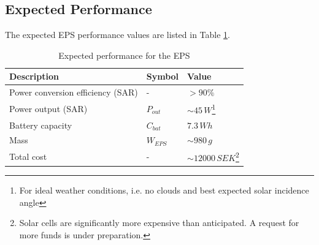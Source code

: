 \subsection{Expected Performance}
The expected \ac{EPS} performance values are listed in Table \ref{tab:expected_performance}.
%
\begin{table}[H]
\centering
\caption{Expected performance for the \ac{EPS}}
\label{tab:expected_performance}
\begin{minipage}{\textwidth}
\begin{tabular}{p{}p{}p{}}
\hline
\textbf{Description} & \textbf{Symbol} & \textbf{Value}\\
\hline
Power conversion efficiency (SAR) & - & $>90\%$\\
Power output (SAR) & $P_{out}$ & $\sim 45\,W$\footnote{For ideal weather conditions, i.e. no clouds and best expected solar incidence angle}\\
Battery capacity & $C_{bat}$ & $7.3\,Wh$\\
Mass & $W_{EPS}$ & $\sim980\,g$\\
Total cost & - & $\sim12000\,SEK$\footnote{Solar cells are significantly more expensive than anticipated. A request for more funds is under preparation.}\\
\hline
\end{tabular}\par
\vspace{-0.75\skip\footins}
\renewcommand{\footnoterule}{}
\end{minipage}
\end{table}
%
%
